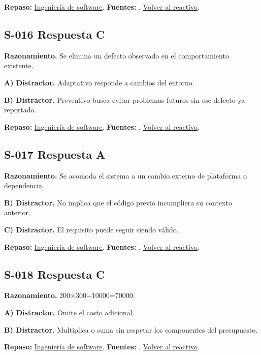 \textbf{Repaso:} \hyperref[sec:s1]{Ingeniería de software}. \textbf{Fuentes:} \cite{scrum,swebok}. \hyperref[q:S-015]{Volver al reactivo}.\par\medskip

\subsection*{S-016 \quad Respuesta C}\label{s:S-016}
\textbf{Razonamiento.} Se elimina un defecto observado en el comportamiento existente.

\textbf{A) Distractor. }Adaptativo responde a cambios del entorno.

\textbf{B) Distractor. }Preventivo busca evitar problemas futuros sin ese defecto ya reportado.

\textbf{Repaso:} \hyperref[sec:s1]{Ingeniería de software}. \textbf{Fuentes:} \cite{scrum,swebok}. \hyperref[q:S-016]{Volver al reactivo}.\par\medskip

\subsection*{S-017 \quad Respuesta A}\label{s:S-017}
\textbf{Razonamiento.} Se acomoda el sistema a un cambio externo de plataforma o dependencia.

\textbf{B) Distractor. }No implica que el código previo incumpliera su contexto anterior.

\textbf{C) Distractor. }El requisito puede seguir siendo válido.

\textbf{Repaso:} \hyperref[sec:s1]{Ingeniería de software}. \textbf{Fuentes:} \cite{scrum,swebok}. \hyperref[q:S-017]{Volver al reactivo}.\par\medskip

\subsection*{S-018 \quad Respuesta C}\label{s:S-018}
\textbf{Razonamiento.} 200×300+10000=70000.

\textbf{A) Distractor. }Omite el costo adicional.

\textbf{B) Distractor. }Multiplica o suma sin respetar los componentes del presupuesto.

\textbf{Repaso:} \hyperref[sec:s1]{Ingeniería de software}. \textbf{Fuentes:} \cite{scrum,swebok}. \hyperref[q:S-018]{Volver al reactivo}.\par\medskip

